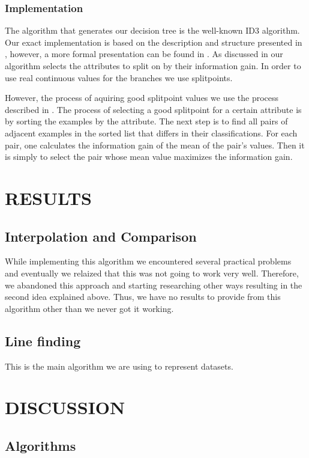 \documentclass[a4paper, 10pt, conference]{ieeeconf}      %
\begin{document}
\subsubsection{Implementation}
The algorithm that generates our decision tree is the well-known ID3 algorithm. Our exact implementation is based on the description and structure presented in \cite{aima}, however, a more formal presentation can be found in \cite{ml3}. As discussed in \cite{aima} our algorithm selects the attributes to split on by their information gain. In order to use real continuous values for the branches we use splitpoints.

However, the process of aquiring good splitpoint values we use the process described in \cite{ml3}. The process of selecting a good splitpoint for a certain attribute is by sorting the examples by the attribute. The next step is to find all pairs of adjacent examples in the sorted list that differs in their classifications. For each pair, one calculates the information gain of the mean of the pair's values. Then it is simply to select the pair whose mean value maximizes the information gain.

\section{RESULTS}

\subsection{Interpolation and Comparison}
While implementing this algorithm we encountered several practical problems and eventually we relaized that this was not going to work very well. Therefore, we abandoned this approach and starting researching other ways resulting in the second idea explained above. Thus, we have no results to provide from this algorithm other than we never got it working.

\subsection{Line finding}
This is the main algorithm we are using to represent datasets. 

\section{DISCUSSION}

\subsection{Algorithms}
\end{document}
